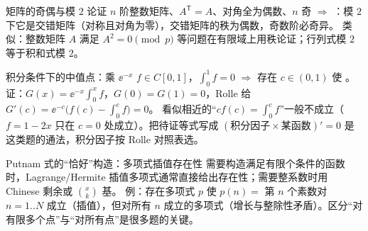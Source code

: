 \begin{结论}{矩阵的奇偶与模 $2$ 论证}
$n$ 阶整数矩阵、$A^{\mathsf T}=A$、对角全为偶数、$n$ 奇 $\Rightarrow$ ：模 $2$ 下它是交错矩阵（对称且对角为零），交错矩阵的秩为偶数，奇数阶必奇异。
类似：整数矩阵 $A$ 满足 $A^2=0\pmod p$ 等问题在有限域上用秩论证；行列式模 $2$ 等于积和式模 $2$。
\end{结论}

\begin{结论}{积分条件下的中值点：乘 $\ee^{-x}$}
$f\in C[0,1]$，$\int_0^1f=0$ $\Rightarrow$ 存在 $c\in(0,1)$ 使 。证：$G(x)=\ee^{-x}\int_0^xf$，$G(0)=G(1)=0$，Rolle 给 $G'(c)=\ee^{-c}\bigl(f(c)-\int_0^cf\bigr)=0$。
 看似相近的“$cf(c)=\int_0^cf$”一般不成立（$f=1-2x$ 只在 $c=0$ 处成立）。把待证等式写成 $(\text{积分因子}\times\text{某函数})'=0$ 是这类题的通法，积分因子按 Rolle 对照表选。
\end{结论}

\begin{结论}{Putnam 式的“恰好”构造：多项式插值存在性}
需要构造满足有限个条件的函数时，Lagrange/Hermite 插值多项式通常直接给出存在性；需要整系数时用 Chinese 剩余或 $\binom xk$ 基。
例：存在多项式 $p$ 使 $p(n)=$ 第 $n$ 个素数对 $n=1..N$ 成立（插值），但对所有 $n$ 成立的多项式（增长与整除性矛盾）。区分“对有限多个点”与“对所有点”是很多题的关键。
\end{结论}

